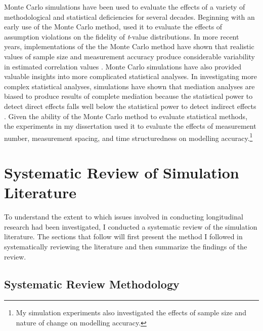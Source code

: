 \documentclass[
12pt, %
twoside,
english]{guelphthesis}
\begin{document}
Monte Carlo simulations have been used to evaluate the effects of a variety of methodological and statistical deficiencies for several decades. Beginning with an early use of the Monte Carlo method, \textcite{boneau1960} used it to evaluate the effects of assumption violations on the fidelity of \emph{t}-value distributions. In more recent years, implementations of the the Monte Carlo method have shown that realistic values of sample size
and measurement accuracy produce considerable variability in estimated correlation values \autocite{stanley2014}. Monte Carlo simulations have also provided valuable insights into more complicated statistical analyses. In investigating more complex statistical analyses, simulations have shown that mediation analyses are biased to produce results of complete mediation because the statistical power to detect direct effects falls well below the statistical power to detect indirect effects \autocite{kenny2014}. Given the ability of the Monte Carlo method to evaluate statistical methods, the experiments in my dissertation used it to evaluate the effects of measurement number, measurement spacing, and time structuredness on modelling accuracy.\footnote{My simulation experiments also investigated the effects of sample size and nature of change on modelling accuracy.}

\hypertarget{systematic-review-of-simulation-literature}{%
\section{Systematic Review of Simulation Literature}\label{systematic-review-of-simulation-literature}}

To understand the extent to which issues involved in conducting longitudinal research had been investigated, I conducted a systematic review of the simulation literature. The sections that follow will first present the method I followed in systematically reviewing the literature and then summarize the findings of the review.

\hypertarget{systematic-review-methodology}{%
\subsection{Systematic Review Methodology}\label{systematic-review-methodology}}
\end{document}
